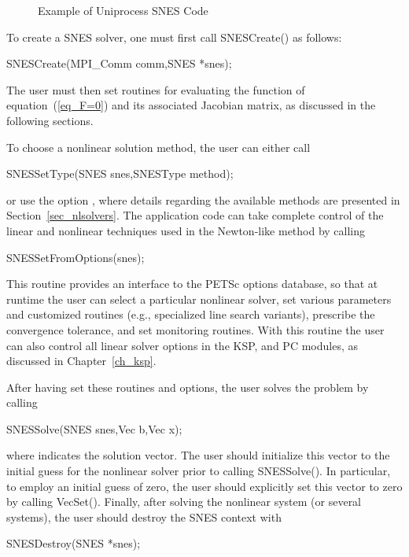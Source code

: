 \begin{figure}[H]
{\small
{}
}
\caption{Example of Uniprocess SNES Code}
\label{fig_snesexample}
\end{figure}

To create a SNES solver, one must first call SNESCreate() as follows:
\begin{tabbing}
  SNESCreate(MPI\_Comm comm,SNES *snes);\\
\end{tabbing}
The user must then set
routines for evaluating the function of equation~(\ref{eq_F=0}) and its
associated Jacobian matrix, as discussed in the following sections.

To choose a nonlinear solution method, the user can either
call
\begin{tabbing}
  SNESSetType(SNES snes,SNESType method);
\end{tabbing}
or use the option , 
where details regarding the available methods are presented in
Section~\ref{sec_nlsolvers}.
The application code can take complete control of the linear and
nonlinear techniques used in the Newton-like method by calling
\begin{tabbing}
  SNESSetFromOptions(snes);
\end{tabbing}
This routine provides an interface to the PETSc options database, so
that at runtime the user can select a particular nonlinear solver, set
various parameters and customized routines (e.g., specialized line
search variants), prescribe the convergence tolerance, and set
monitoring routines.  With this routine the user can also control all
linear solver options in the KSP, and PC modules, as discussed
in Chapter~\ref{ch_ksp}.

After having set these routines and options, the user
solves the problem by calling
\begin{tabbing}
  SNESSolve(SNES snes,Vec b,Vec x);
\end{tabbing}
where  indicates the solution vector. The user should
initialize this vector to the initial guess for the nonlinear solver
prior to calling SNESSolve().  In particular, to employ an
initial guess of zero, the user should explicitly set this vector to
zero by calling VecSet().  Finally, after solving the nonlinear
system (or several systems), the user should destroy the SNES context
with
\begin{tabbing}
  SNESDestroy(SNES *snes);
\end{tabbing}

